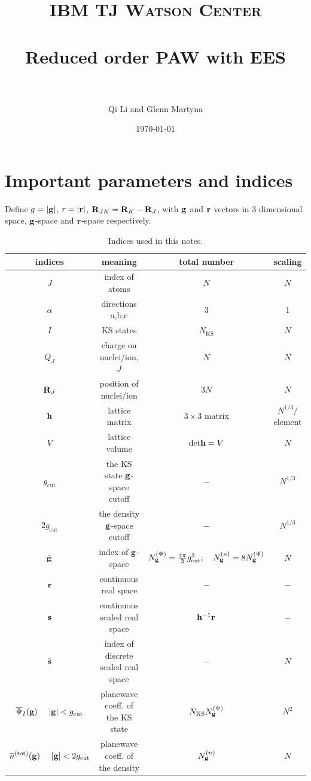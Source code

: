 \documentclass[paper=a4, fontsize=11pt]{article} %
\title{	
\normalfont \normalsize 
\textsc{IBM TJ Watson Center} \\ [14pt] %
\horrule{0.5pt} \\[0.2cm] %
\huge Reduced order PAW with EES \\ %
\horrule{2pt} \\[0.2cm] %
}
\author{Qi Li and Glenn Martyna} %
\date{\normalsize\today} %
\numberwithin{equation}{section} %
\numberwithin{figure}{section} %
\numberwithin{table}{section} %
\newcommand{\ol}{\overline}
\newcommand{\bh}{{\bf{h}}}
\newcommand{\bs}{{\bf{s}}}
\newcommand{\bg}{{\bf{g}}}
\newcommand{\br}{{\bf{r}}}
\newcommand{\bR}{{\bf{R}}}
\newcommand{\rcut}{{\mathrm{cut}}}
\newcommand{\rdet}{{\mathrm{det}}}
\newcommand{\rtot}{{\mathrm{tot}}}
\newcommand{\NKS}{{N_{\mathrm{KS}}}}
\newcommand{\Ngp}{{N^{\mathrm{(\Psi})}_\bg}}
\newcommand{\Ngn}{{N^{(n)}_\bg}}
\begin{document}
\maketitle %


\section {Important parameters and indices}

\label{Sec:parameters}

Define $g=|\bg|$, $r=|\br|$, $\bR_{JK} = \bR_K - \bR_J$, with $\bg$ and $\br$ vectors in 3 dimensional space, $\bg$-space and $\br$-space respectively.\\


\begin{table}[!htbp]
\caption{\label{index} Indices used in this notes.}
\begin{center}
\begin{tabular}{ c  c  c  c}
  \hline\hline
  indices & meaning & total number & scaling	\\
  \hline
  $J$ & index of atoms & $N$ &$N$ \\
  $\alpha$ & directions a,b,c & 3 & 1 \\
  $I$ & KS states & $N_{\mathrm{KS}}$ & $N$ \\
  $Q_J$ & charge on nuclei/ion, $J$ &$N$ &$N$ \\
  $\bR_J$ & position of nuclei/ion &$3N$ &$N$\\
  $\bh$ & lattice matrix & $3\times 3$ matrix & $N^{1/3}/$element\\
  $V$ & lattice volume & $\rdet \bh = V$ & $N$ \\
  $g_\rcut$ & the KS state $\bg$-space cutoff & $-$ & $N^{1/3}$ \\
  $2g_\rcut$ & the density $\bg$-space cutoff & $-$ & $N^{1/3}$ \\
  $\hat \bg$  & index of $\bg$-space & $N_\bg^{(\Psi)} = \frac{4\pi}{3}g_\rcut^3;\ \ \ N_\bg^{(n)} = 8N_\bg^{(\Psi)}$ & $N$ \\
  $\br$ & continuous real space & $-$ & $-$ \\
  $\bs$ & continuous scaled real space  & $\bh^{-1}\br$ & $-$ \\
  $\hat \bs$ & index of discrete scaled real space & $-$ & $N$ \\
  $\ol \Psi_I(\bg)\ \ \ \ |\bg|<g_{\rcut}$ & planewave coeff. of the KS state & $\NKS \Ngp$ & $N^2$ \\
  $\ol n^{(\rtot)}(\bg)\ \ \ \ |\bg|<2g_{\rcut}$ & planewave coeff. of the density & $\Ngn$ & $N$ \\
  \hline\hline
\end{tabular}
\end{center}
\end{table}
\end{document}
